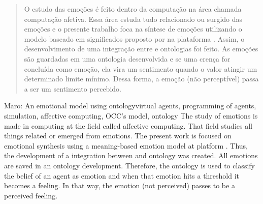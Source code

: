 \begin{abstract}
O estudo das emoções é feito dentro da computação na área chamada computação
afetiva. Essa área estuda tudo relacionado ou surgido das emoções e o presente
trabalho foca na síntese de emoções utilizando o modelo baseado em
significados proposto por \citet{ortony1988cse} na plataforma \jason
\cite{bordini-jason}. Assim, o desenvolvimento de uma integração entre \jason
e ontologias foi feito. As emoções são guardadas em uma ontologia desenvolvida
e se uma crença for concluída como emoção, ela vira um sentimento quando o
valor atingir um determinado limite mínimo. Dessa forma, a emoção (não
perceptível) passa a ser um sentimento percebido.
\end{abstract}

\begin{englishabstract}{Maro: An emotional model using ontology}{virtual agents, programming of
agents, simulation, affective computing, OCC's model, ontology}
The study of emotions is made in computing at the field called affective
computing. That field studies all things related or emerged from emotions. The
present work is focused on emotional synthesis using a meaning-based emotion
model \cite{ortony1988cse} at \jason platform \cite{bordini-jason}. Thus, the
development of a integration between \jason and ontology was created. All
emotions are saved in an ontology development. Therefore, the ontology is used
to classify the belief of an agent as emotion and when that emotion hits a
threshold it becomes a feeling. In that way, the emotion (not perceived)
passes to be a perceived feeling.
\end{englishabstract}


